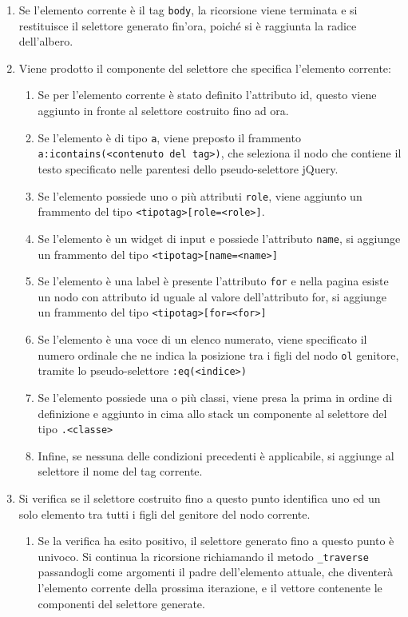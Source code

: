 \documentclass[12pt]{toptesi}
\begin{document}
\begin{enumerate}
\item Se l'elemento corrente è il tag \verb|body|, la ricorsione viene terminata e si restituisce il selettore generato fin'ora, poiché si è raggiunta la radice dell'albero.
\item Viene prodotto il componente del selettore che specifica l'elemento corrente:
	\begin{enumerate}
		\item Se per l'elemento corrente è stato definito l'attributo id, questo viene aggiunto  in fronte al selettore costruito fino ad ora.
		\item Se l'elemento è di tipo \verb|a|, viene preposto il frammento \verb|a:icontains(<contenuto del tag>)|, che seleziona il nodo che contiene il testo specificato nelle parentesi dello pseudo-selettore jQuery.
		\item Se l'elemento possiede uno o più attributi \verb|role|, viene aggiunto un frammento del tipo \verb|<tipotag>[role=<role>]|.
		\item Se l'elemento è un widget di input e possiede l'attributo \verb|name|, si aggiunge un frammento del tipo \verb|<tipotag>[name=<name>]|
		\item Se l'elemento è una label è presente l'attributo \verb|for| e nella pagina esiste un nodo con attributo id uguale al valore dell'attributo for, si aggiunge un frammento del tipo \verb|<tipotag>[for=<for>]| 
		\item Se l'elemento è una voce di un elenco numerato, viene specificato il numero ordinale che ne indica la posizione tra i figli del nodo \verb|ol| genitore, tramite lo pseudo-selettore \verb|:eq(<indice>)|
		\item Se l'elemento possiede una o più classi, viene presa la prima in ordine di definizione e aggiunto in cima allo stack un componente al selettore del tipo \verb|.<classe>|
		\item Infine, se nessuna delle condizioni precedenti è applicabile, si aggiunge al selettore il nome del tag corrente.
	\end{enumerate}
\item Si verifica se il selettore costruito fino a questo punto identifica uno ed un solo elemento tra tutti i figli del genitore del nodo corrente.
	\begin{enumerate}
		\item Se la verifica ha esito positivo, il selettore generato fino a questo punto è univoco. Si continua la ricorsione richiamando il metodo \verb|_traverse| passandogli come argomenti il padre dell'elemento attuale, che diventerà l'elemento corrente della prossima iterazione, e il vettore contenente le componenti del selettore generate.

\end{enumerate}
\end{enumerate}
\end{document}
